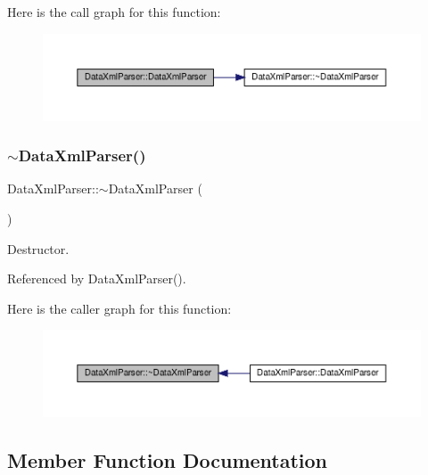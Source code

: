 Here is the call graph for this function\+:
\nopagebreak
\begin{figure}[H]
\begin{center}
\leavevmode
\includegraphics[width=350pt]{d9/db6/classDataXmlParser_a61f895e7ddc005480a5941d41d7f0e9a_cgraph}
\end{center}
\end{figure}
\mbox{\label{classDataXmlParser_aceaed5bce88113f28b3db70774c5c577}} 
\subsubsection{\texorpdfstring{$\sim$\+Data\+Xml\+Parser()}{~DataXmlParser()}}
{\footnotesize\ttfamily Data\+Xml\+Parser\+::$\sim$\+Data\+Xml\+Parser (\begin{DoxyParamCaption}{ }\end{DoxyParamCaption})\hspace{0.3cm}{\ttfamily [default]}}



Destructor. 



Referenced by Data\+Xml\+Parser().

Here is the caller graph for this function\+:
\nopagebreak
\begin{figure}[H]
\begin{center}
\leavevmode
\includegraphics[width=350pt]{d9/db6/classDataXmlParser_aceaed5bce88113f28b3db70774c5c577_icgraph}
\end{center}
\end{figure}


\subsection{Member Function Documentation}
\mbox{\label{classDataXmlParser_a3f071ae4083e3a512e771502f89c7fab}} 
